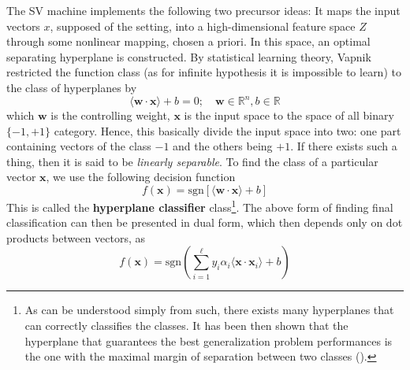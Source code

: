 \documentclass[10pt]{article} %
\begin{document}
The SV machine implements the following two precursor ideas: It maps the input vectors $x$, supposed of the setting, into a high-dimensional feature space $Z$ through some nonlinear mapping, chosen a priori. In this space, an optimal separating hyperplane is constructed. By statistical learning theory, Vapnik restricted the function class (as for infinite hypothesis it is impossible to learn) to the class of hyperplanes by 
\begin{equation}
    \langle \mathbf{w}\cdot \mathbf{x} \rangle + b = 0 ; \quad \mathbf{w}\in \mathbb{R}^{n} , b\in \mathbb{R}
\end{equation}
which $\mathbf{w}$ is the controlling weight, $\mathbf{x}$ is the input space to the space of all binary $\{-1,+1\}$ category. Hence, this basically divide the input space into two: one part containing vectors of the class $-1$ and the others being $+1$. If there exists such a thing, then it is said to be \textit{linearly separable}. To find the class of a particular vector $\mathbf{x}$, we use the following decision function 
\begin{equation}
    f(\mathbf{x}) = \mathrm{sgn}[\langle \mathbf{w}\cdot \mathbf{x}\rangle+ b]
\end{equation}
This is called the \textbf{hyperplane classifier} class\footnote{As can be understood simply from such, there exists many hyperplanes that can correctly classifies the classes. It has been then shown that the hyperplane that guarantees the best generalization problem performances is the one with the maximal margin of separation between two classes (\cite{Cristianini2000AnIT}).}. The above form of finding final classification can then be presented in dual form, which then depends only on dot products between vectors, as 
\begin{equation}
    f(\mathbf{x}) = \mathrm{sgn}\left(\sum^{\ell}_{i=1} y_{i}\alpha_{i} \langle \mathbf{x}\cdot \mathbf{x}_{i} \rangle+ b\right)
\end{equation} 
\end{document}

